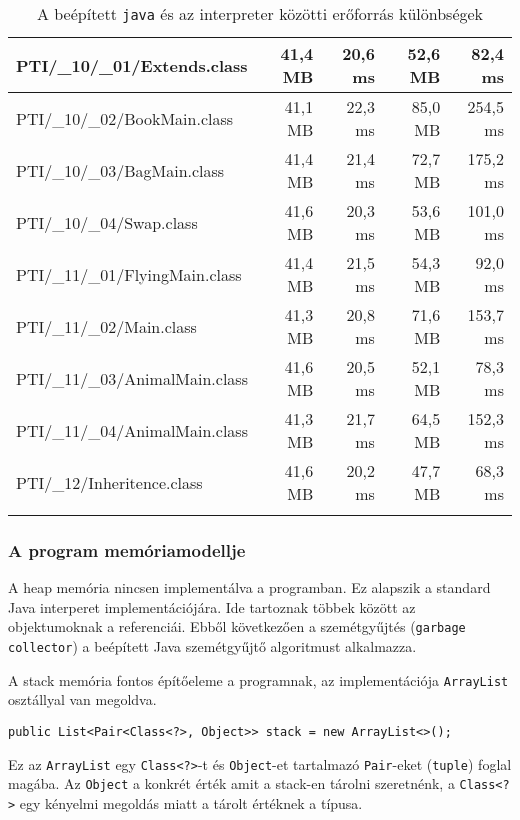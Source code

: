 \begin{center}
\begin{longtable}{ | l | r | r | r | r | }
		\hline
		PTI/\_10/\_01/Extends.class & 41,4 MB & 20,6 ms & 52,6 MB & 82,4 ms \\
		\hline
		PTI/\_10/\_02/BookMain.class & 41,1 MB & 22,3 ms & 85,0 MB & 254,5 ms \\
		\hline
		PTI/\_10/\_03/BagMain.class & 41,4 MB & 21,4 ms & 72,7 MB & 175,2 ms \\
		\hline
		PTI/\_10/\_04/Swap.class & 41,6 MB & 20,3 ms & 53,6 MB & 101,0 ms \\
		\hline
		PTI/\_11/\_01/FlyingMain.class & 41,4 MB & 21,5 ms & 54,3 MB & 92,0 ms \\
		\hline
		PTI/\_11/\_02/Main.class & 41,3 MB & 20,8 ms & 71,6 MB & 153,7 ms \\
		\hline
		PTI/\_11/\_03/AnimalMain.class & 41,6 MB & 20,5 ms & 52,1 MB & 78,3 ms \\
		\hline
		PTI/\_11/\_04/AnimalMain.class & 41,3 MB & 21,7 ms & 64,5 MB & 152,3 ms \\
		\hline
		PTI/\_12/Inheritence.class & 41,6 MB & 20,2 ms & 47,7 MB & 68,3 ms \\
		\hline

		\caption[Erőforrás különbségek]{A beépített \lstinline{java} és az interpreter közötti erőforrás különbségek}
		\label{table:resource}
	\end{longtable}
\end{center}

\subsubsection{A program memóriamodellje}

A heap memória nincsen implementálva a programban. Ez alapszik a standard Java interperet implementációjára. Ide tartoznak többek között az objektumoknak a referenciái. Ebből következően a szemétgyűjtés (\lstinline{garbage collector}) a beépített Java szemétgyűjtő algoritmust alkalmazza.

A stack memória fontos építőeleme a programnak, az implementációja \lstinline{ArrayList} osztállyal van megoldva.
\begin{verbatim}
public List<Pair<Class<?>, Object>> stack = new ArrayList<>();
\end{verbatim}
Ez az \lstinline{ArrayList} egy \lstinline{Class<?>}-t és \lstinline{Object}-et tartalmazó \lstinline{Pair}-eket (\lstinline{tuple}) foglal magába. Az \lstinline{Object} a konkrét érték amit a stack-en tárolni szeretnénk, a \lstinline{Class<?>} egy kényelmi megoldás miatt a tárolt értéknek a típusa.

